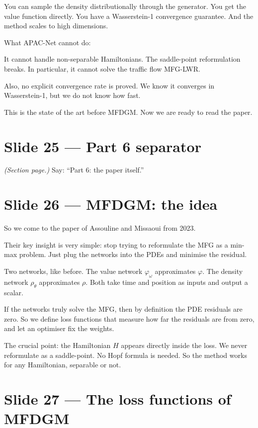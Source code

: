 \documentclass[11pt]{article}
\begin{document}
You can sample the density distributionally through the generator. You get
the value function directly. You have a Wasserstein-1 convergence
guarantee. And the method scales to high dimensions.

What APAC-Net cannot do:

It cannot handle non-separable Hamiltonians. The saddle-point reformulation
breaks. In particular, it cannot solve the traffic flow MFG-LWR.

Also, no explicit convergence rate is proved. We know it converges in
Wasserstein-1, but we do not know how fast.

This is the state of the art before MFDGM. Now we are ready to read the paper.

\section*{Slide 25 --- Part 6 separator}

\textit{(Section page.)}  Say: ``Part 6: the paper itself.''

\section*{Slide 26 --- MFDGM: the idea}

So we come to the paper of Assouline and Missaoui from 2023.

Their key insight is very simple: stop trying to reformulate the MFG as a
min-max problem. Just plug the networks into the PDEs and minimise the
residual.

Two networks, like before. The value network $\varphi_\omega$ approximates
$\varphi$. The density network $\rho_\theta$ approximates $\rho$. Both take
time and position as inputs and output a scalar.

If the networks truly solve the MFG, then by definition the PDE residuals
are zero. So we define loss functions that measure how far the residuals
are from zero, and let an optimiser fix the weights.

The crucial point: the Hamiltonian $H$ appears directly inside the loss. We
never reformulate as a saddle-point. No Hopf formula is needed. So the
method works for any Hamiltonian, separable or not.

\section*{Slide 27 --- The loss functions of MFDGM}
\end{document}
